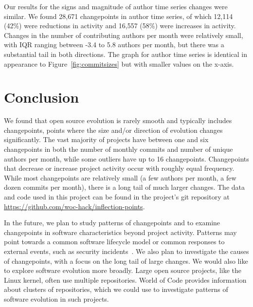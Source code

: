 \documentclass[10pt,conference]{IEEEtran}
\begin{document}
Our results for the signs and magnitude of author time series changes were similar. We found 28,671 changepoints in author time series, of which 12,114 (42\%) were reductions in activity and 16,557 (58\%) were increases in activity. Changes in the number of contributing authors per month were relatively small, with IQR ranging between -3.4 to 5.8 authors per month, but there was a substantial tail in both directions. The graph for author time series is identical in appearance to Figure~\ref{fig:commitsizes} but with smaller values on the x-axis.

\section{Conclusion}

We found that open source evolution is rarely smooth and typically includes changepoints, points where the size and/or direction of evolution changes significantly. The vast majority of projects have between one and six changepoints in both the number of monthly commits and number of unique authors per month, while some outliers have up to 16 changepoints. Changepoints that decrease or increase project activity occur with roughly equal frequency. While most changepoints are relatively small (a few authors per month, a few dozen commits per month), there is a long tail of much larger changes. The data and code used in this project can be found in the project's git repository at \url{https://github.com/woc-hack/inflection-points}.

In the future, we plan to study patterns of changepoints and to examine changepoints in software characteristics beyond project activity. Patterns may point towards a common software lifecycle model or common responses to external events, such as security incidents~\cite{openssl2020}. We also plan to investigate the causes of changepoints, with a focus on the long tail of large changes. We would also like to explore software evolution more broadly. Large open source projects, like the Linux kernel, often use multiple repositories. World of Code provides information about clusters of repositories, which we could use to investigate patterns of software evolution in such projects.



\end{document}
